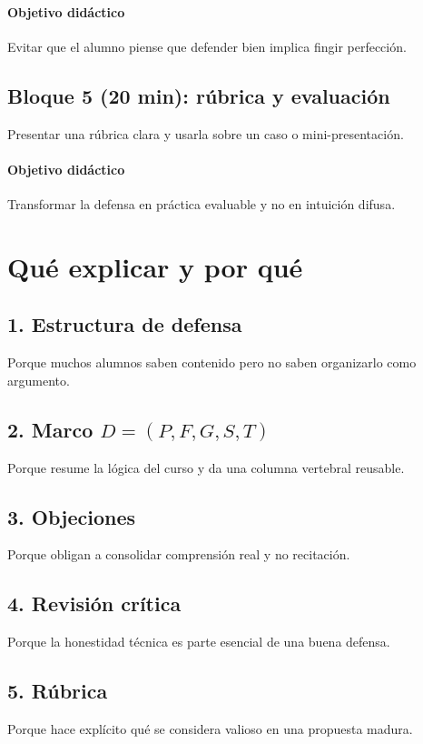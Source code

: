 \documentclass[variant=docente,cover=institutional,mode=screen]{ua-engineering-v6-article}
\begin{document}
\paragraph{Objetivo didáctico}
Evitar que el alumno piense que defender bien implica fingir perfección.

\subsection*{Bloque 5 (20 min): rúbrica y evaluación}
Presentar una rúbrica clara y usarla sobre un caso o mini-presentación.

\paragraph{Objetivo didáctico}
Transformar la defensa en práctica evaluable y no en intuición difusa.

\section{Qué explicar y por qué}

\subsection*{1. Estructura de defensa}
Porque muchos alumnos saben contenido pero no saben organizarlo como argumento.

\subsection*{2. Marco $D=(P,F,G,S,T)$}
Porque resume la lógica del curso y da una columna vertebral reusable.

\subsection*{3. Objeciones}
Porque obligan a consolidar comprensión real y no recitación.

\subsection*{4. Revisión crítica}
Porque la honestidad técnica es parte esencial de una buena defensa.

\subsection*{5. Rúbrica}
Porque hace explícito qué se considera valioso en una propuesta madura.
\end{document}
